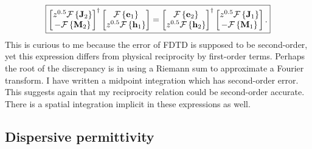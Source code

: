 \begin{equation}
\boxed{
	\begin{bmatrix} z^{0.5} \es{F} \left\{ \ve{J}_2 \right\} \\ - \es{F}\left\{\ve{M}_2\right\} \end{bmatrix}^\dagger
	\begin{bmatrix} \es{F}\left\{ \ve{e}_1 \right\} \\ z^{0.5} \es{F}\left\{\ve{h}_1 \right\} \end{bmatrix}
	=
	\begin{bmatrix} \es{F} \left\{ \ve{e}_2 \right\} \\ z^{0.5} \es{F} \left\{ \ve{h}_2 \right\} \end{bmatrix}^\dagger
	\begin{bmatrix} z^{0.5} \es{F} \left\{ \ve{J}_1 \right\} \\ - \es{F} \left\{ \ve{M}_1 \right\} \end{bmatrix}.
}%
\label{eqn:fourier_reciprocity}
\end{equation}
%
This is curious to me because the error of FDTD is supposed to be second-order, yet this expression differs from physical reciprocity by first-order terms.  Perhaps the root of the discrepancy is in using a Riemann sum to approximate a Fourier transform.  I have written a midpoint integration which has second-order error.  This suggests again that my reciprocity relation could be second-order accurate.  There is a spatial integration implicit in these expressions as well.

\subsection{Dispersive permittivity}

